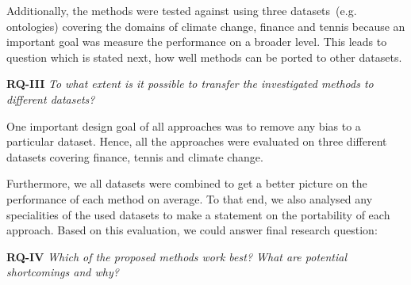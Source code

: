 Additionally, the methods were tested against using three datasets~(e.g. ontologies) covering the domains of climate change, finance and tennis because an important goal was measure the performance on a broader level. This leads to question which is stated next, how well methods can be ported to other datasets. 
 
\textbf{RQ-III} \emph{To what extent is it possible to transfer the investigated methods to different datasets?}

One important design goal of all approaches was to remove any bias to a particular dataset. Hence, all the approaches were evaluated on three different datasets covering finance, tennis and climate change. 

Furthermore, we all datasets were combined to get a better picture on the performance of each method on average. To that end, we also analysed any specialities of the used datasets to make a statement on the portability of each approach. Based on this evaluation, we could answer final research question:

\textbf{RQ-IV} \emph{Which of the proposed methods work best? What are potential shortcomings and why?}


